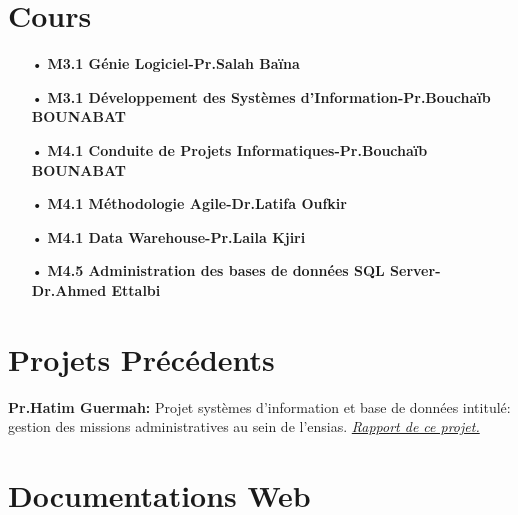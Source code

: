 \documentclass[a4paper]{report}
\begin{document}
\begin{doublespace}
	\section{Cours}

	\begin{itemize}
		\item[•] \textbf{M3.1 Génie Logiciel-Pr.Salah Baïna}
		\item[•] \textbf{M3.1 Développement des Systèmes d’Information-Pr.Bouchaïb BOUNABAT}
		\item[•] \textbf{M4.1 Conduite de Projets Informatiques-Pr.Bouchaïb BOUNABAT}
		\item[•] \textbf{M4.1 Méthodologie Agile-Dr.Latifa Oufkir}
		\item[•] \textbf{M4.1 Data Warehouse-Pr.Laila Kjiri}
		\item[•] \textbf{M4.5 Administration des bases de données SQL Server-Dr.Ahmed Ettalbi}
	\end{itemize}

	\section{Projets Précédents}

	\textbf{Pr.Hatim Guermah:} Projet systèmes d’information et base de données intitulé: gestion des missions
	administratives au sein de l’ensias. \href{https://drive.google.com/file/d/13BZiRGEFTJO-wN1fIeIMevWrprIbC12t/view?usp=sharing}{\textit{Rapport de ce projet.}}
	\section{Documentations Web}


\end{doublespace}
\end{document}
